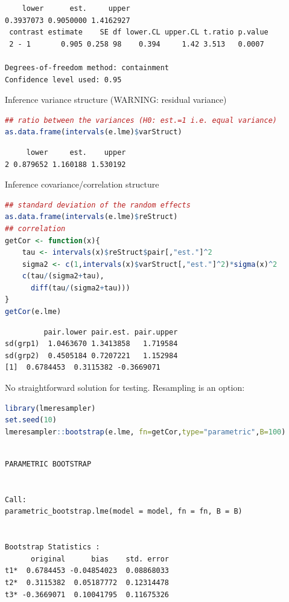 \documentclass{article}
\begin{document}
\label{}
\begin{verbatim}
    lower      est.     upper 
0.3937073 0.9050000 1.4162927
 contrast estimate    SE df lower.CL upper.CL t.ratio p.value
 2 - 1       0.905 0.258 98    0.394     1.42 3.513   0.0007 

Degrees-of-freedom method: containment 
Confidence level used: 0.95
\end{verbatim}


\clearpage

Inference variance structure (WARNING: residual variance)
\begin{lstlisting}[language=r,numbers=none]
## ratio between the variances (H0: est.=1 i.e. equal variance)
as.data.frame(intervals(e.lme)$varStruct)
\end{lstlisting}

\label{}
\begin{verbatim}
     lower     est.    upper
2 0.879652 1.160188 1.530192
\end{verbatim}


Inference covariance/correlation structure
\begin{lstlisting}[language=r,numbers=none]
## standard deviation of the random effects
as.data.frame(intervals(e.lme)$reStruct)
## correlation
getCor <- function(x){
    tau <- intervals(x)$reStruct$pair[,"est."]^2
    sigma2 <- c(1,intervals(x)$varStruct[,"est."]^2)*sigma(x)^2
    c(tau/(sigma2+tau),
      diff(tau/(sigma2+tau)))
}
getCor(e.lme)
\end{lstlisting}

\label{}
\begin{verbatim}
         pair.lower pair.est. pair.upper
sd(grp1)  1.0463670 1.3413858   1.719584
sd(grp2)  0.4505184 0.7207221   1.152984
[1]  0.6784453  0.3115382 -0.3669071
\end{verbatim}


No straightforward solution for testing. Resampling is an option:
\begin{lstlisting}[language=r,numbers=none]
library(lmeresampler)
set.seed(10)
lmeresampler::bootstrap(e.lme, fn=getCor,type="parametric",B=100)
\end{lstlisting}

\label{}
\begin{verbatim}

PARAMETRIC BOOTSTRAP


Call:
parametric_bootstrap.lme(model = model, fn = fn, B = B)


Bootstrap Statistics :
      original      bias    std. error
t1*  0.6784453 -0.04854023  0.08868033
t2*  0.3115382  0.05187772  0.12314478
t3* -0.3669071  0.10041795  0.11675326
\end{verbatim}
\end{document}
